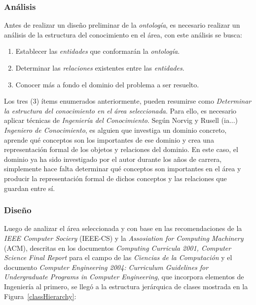 \subsubsection{Análisis}
Antes de realizar un diseño preliminar de la \textit{ontología}, es necesario realizar un análisis de la estructura del conocimiento en el área, con este análisis se busca:

\begin{enumerate}
    \item Establecer las \textit{entidades} que conformarán la \textit{ontología}.
    \item Determinar las \textit{relaciones} existentes entre las \textit{entidades}.
    \item Conocer más a fondo el dominio del problema a ser resuelto.
\end{enumerate}

Los tres (3) ítems enumerados anteriormente, pueden resumirse como \textit{Determinar la estructura del conocimiento en el área seleccionada}. Para ello, es necesario aplicar técnicas de \textit{Ingeniería del Conocimiento}. Según Norvig y Rusell (ia...) \textit{Ingeniero de Conocimiento}, es alguien que investiga un dominio concreto, aprende qué conceptos son los importantes de ese dominio y crea una representación formal de los objetos y relaciones del dominio. En este caso, el dominio ya ha sido investigado por el autor durante los años de carrera, simplemente hace falta determinar qué conceptos son importantes en el área y producir la representación formal de dichos conceptos y las relaciones que guardan entre sí.

\subsubsection{Diseño}
Luego de analizar el área seleccionada y con base en las recomendaciones de la \textit{IEEE Computer Sociery} (IEEE-CS) y la \textit{Assosiation for Computing Machinery} (ACM), descritas en los documentos \textit{Computing Curricula 2001, Computer Science Final Report} para el campo de las \textit{Ciencias de la Computación} y el documento \textit{Computer Engineering 2004: Curriculum Guidelines for Undergraduate Programs in Computer Engineering}, que incorpora elementos de Ingeniería al primero, se llegó a la estructura jerárquica de clases mostrada en la  Figura~\ref{classHierarchy}:

\newpage


